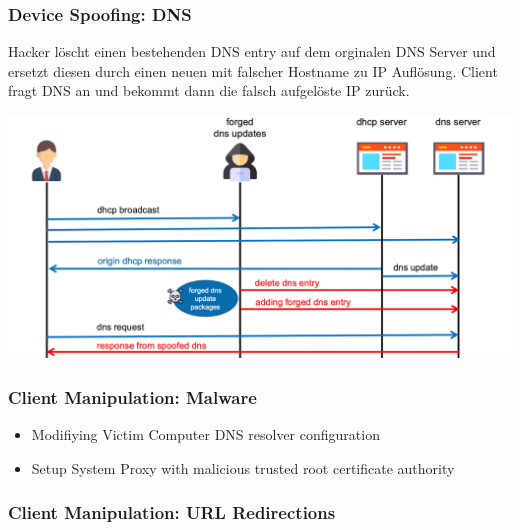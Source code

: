 \subsubsection{Device Spoofing: DNS}
Hacker löscht einen bestehenden DNS entry auf dem orginalen DNS Server und ersetzt diesen durch einen neuen mit falscher Hostname zu IP Auflösung. Client fragt DNS an und bekommt dann die falsch aufgelöste IP zurück.
\begin{center}
    \vspace{-8pt}
    \includegraphics[width=1.0\linewidth]{./img/09-mitm/dns}
    \vspace{-8pt}
\end{center}

\subsubsection{Client Manipulation: Malware}
\begin{itemize}
    \item Modifiying Victim Computer DNS resolver configuration
    \item Setup System Proxy with malicious trusted root certificate authority
\end{itemize}


\subsubsection{Client Manipulation: URL Redirections}

